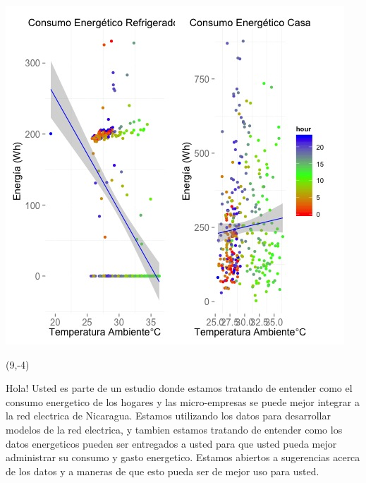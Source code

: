 \documentclass{article}\usepackage[]{graphicx}\usepackage[]{color}
\newenvironment{knitrout}{}{} %
\begin{document}
\begin{knitrout}
\color{fgcolor}
\includegraphics[scale=0.75]{figure/A17_correlaciones} 
\end{knitrout}

 \begin{textblock}{1}(9,-4)
\begin{minipage}{20em}
\begingroup

\endgroup
\end{minipage}
\end{textblock}

\vspace{70px}
\begin{knitrout}
Hola! Usted es parte de un estudio donde estamos tratando de entender como el consumo energetico de los hogares y las micro-empresas se puede mejor integrar a la red electrica de Nicaragua. Estamos utilizando los datos para desarrollar modelos de la red electrica, y tambien estamos tratando de entender como los datos energeticos pueden ser entregados a usted para que usted pueda mejor administrar su consumo y gasto energetico.  Estamos abiertos a sugerencias acerca de los datos y a maneras de que esto pueda ser de mejor uso para usted.
\end{knitrout}
\end{document}
